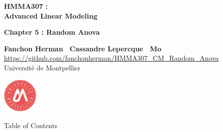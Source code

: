 \documentclass[unknownkeysallowed]{beamer}
\begin{document}



\begin{frame}
\bigskip
\bigskip
\begin{center}{
\LARGE\color{marron}
\textbf{HMMA307 : \\ Advanced Linear Modeling}
\textbf{ }\\
\vspace{0.5cm}
}

\color{marron}
\textbf{Chapter 5 : Random Anova}
\end{center}

\vspace{0.5cm}

\begin{center}
\textbf{Fanchon Herman \ Cassandre Lepercque \ Mo} \\
\vspace{0.1cm}
\url{https://github.com/fanchonherman/HMMA307_CM_Random_Anova}\\
\vspace{0.5cm}
Université de Montpellier \\
\end{center}

\centering
\includegraphics[width=0.13\textwidth]{Logo}

\end{frame}






\begin{frame}{Table of Contents}
\tableofcontents[hideallsubsections]
\end{frame}
\end{document}
